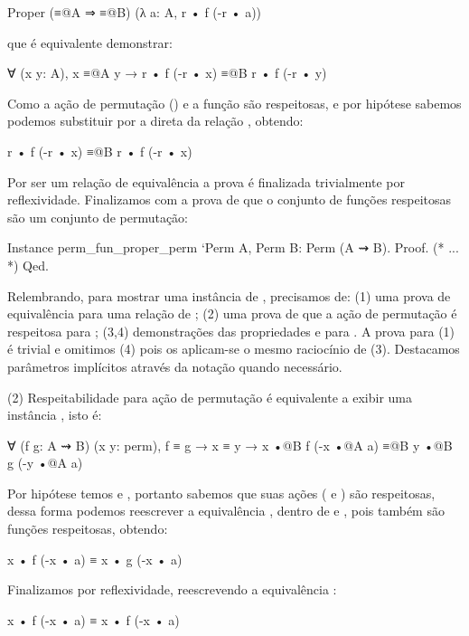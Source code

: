 \begin{description}
	\begin{coqcode}
Proper (≡@{A} ⇒ ≡@{B}) (λ a: A, r • f (-r • a))
	\end{coqcode}
	que é equivalente demonstrar:
	\begin{coqcode}
∀ (x y: A), x ≡@{A} y → r • f (-r • x) ≡@{B} r • f (-r • y)
 	\end{coqcode}
 	Como a ação de permutação () e a função  são respeitosas, e por hipótese sabemos  podemos substituir  por  a direta da relação , obtendo:
	\begin{coqcode}
r • f (-r • x) ≡@{B} r • f (-r • x)
    \end{coqcode}
	Por  ser um relação de equivalência a prova é finalizada trivialmente por reflexividade. Finalizamos com a prova de que o conjunto de funções respeitosas são um conjunto de permutação:
	\begin{coqcode}
Instance perm_fun_proper_perm `{Perm A, Perm B}: Perm (A ⇝ B).
Proof. (* ... *) Qed.
	\end{coqcode}
	Relembrando, para mostrar uma instância de , precisamos de: (1) uma prova de equivalência para uma relação de ; (2) uma prova de que a ação de permutação é respeitosa para ; (3,4) demonstrações das propriedades  e  para . A prova para (1) é trivial e omitimos (4) pois os aplicam-se o mesmo raciocínio de (3). Destacamos parâmetros implícitos através da notação  quando necessário.
	
	(2) Respeitabilidade para ação de permutação é equivalente a exibir uma instância , isto é:
	\begin{coqcode}
∀ (f g: A ⇝ B) (x y: perm), f ≡ g → x ≡ y → 
   x •@{B} f (-x •@{A} a) ≡@{B} y •@{B} g (-y •@{A} a)
	\end{coqcode}
	Por hipótese temos  e , portanto sabemos que suas ações ( e ) são respeitosas, dessa forma podemos reescrever a equivalência , dentro de  e , pois também são funções respeitosas, obtendo:
    \begin{coqcode}
x • f (-x • a) ≡ x • g (-x • a)
    \end{coqcode}
	Finalizamos por reflexividade, reescrevendo a equivalência :
	\begin{coqcode}
x • f (-x • a) ≡ x • f (-x • a)
	\end{coqcode}


\end{description}
